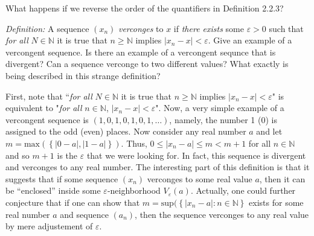 \documentclass[12pt]{article}
\newcommand{\N}{\mathbb{N}}
\newenvironment{problem}[2][Problem]{\begin{trivlist} \item[\hskip \labelsep {\bfseries #1}\hskip \labelsep {\bfseries #2.}]}{\end{trivlist}}
\newenvironment{solution}[1][Solution]{\begin{trivlist} \item[\hskip \labelsep {\bfseries #1}]}{\end{trivlist}}
\begin{document}
    \begin{problem}{2.2.1}
	What happens if we reverse the order of the quantifiers in Definition 2.2.3?
	
	\textit{Definition:} A sequence $(x_{n})$ \textit{verconges} to $x$ if
	\textit{there exists} some $\varepsilon > 0$ such that \textit{for all} $N\in \N$ it is true that $n\geq \N$ implies $|x_{n}-x|<\varepsilon$. 
	Give an example of a vercongent sequence. Is there an example of a vercongent sequnce that is divergent? Can a sequence verconge to two different values? What exactly is being described in this strange definition?
    \begin{solution}
      First, note that ``\textit{for all} $N\in\N$ it is true that $n\geq \N$ implies $|x_{n}-x|<\varepsilon$" is equivalent to "\textit{for all} $n\in\N$, $|x_{n}-x|<\varepsilon$". Now, a very simple example of a vercongent sequence is $(1,0,1,0,1,0,1,\dots)$, namely, the number 1 (0) is assigned to the odd (even) places. Now consider any real number $a$ and let $m=\text{max}(\left\{|0-a|,|1-a|\right\})$. Thus, $0\leq |x_{n}-a|\leq m< m+1$ for all $n\in\N$ and so $m+1$ is the $\varepsilon$ that we were looking for. In fact, this sequence is divergent and verconges to any real number. The interesting part of this definition is that it suggests that if some sequence $(x_{n})$ verconges to some real value $a$, then it can be ``enclosed'' inside some $\varepsilon$-neighborhood $V_{\varepsilon}(a)$. Actually, one could further conjecture that if one can show that $m=\text{sup}(\left\{|x_n-a|:n\in\N\right\}$ exists for some real number $a$ and sequence $(a_{n})$, then the sequence verconges to any real value by mere adjustement of $\varepsilon$.  
    \end{solution}
    \end{problem}
\end{document}
